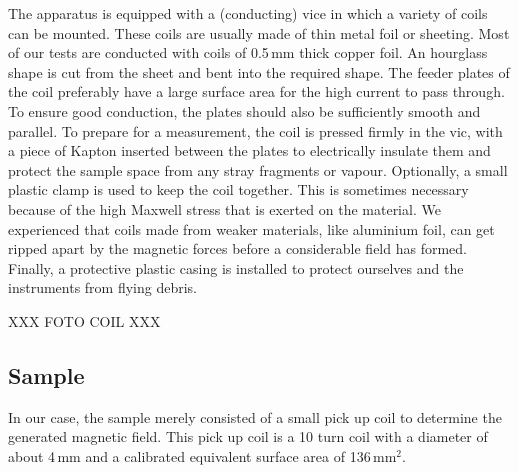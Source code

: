 The apparatus is equipped with a (conducting) vice in which a variety of coils 
can be mounted. These coils are usually made of thin metal foil or sheeting.  
Most of our tests are conducted with coils of 0.5\,mm thick copper foil. An 
hourglass shape is cut from the sheet and bent into the required shape. The 
feeder plates of the coil preferably have a large surface area for the high 
current to pass through. To ensure good conduction, the plates should also be 
sufficiently smooth and parallel. To prepare for a measurement, the coil is 
pressed firmly in the vic, with a piece of Kapton inserted between the plates 
to electrically insulate them and protect the sample space from any stray 
fragments or vapour. Optionally, a small plastic clamp is used to keep the coil 
together. This is sometimes necessary because of the high Maxwell stress that 
is exerted on the material. We experienced that coils made from weaker 
materials, like aluminium foil, can get ripped apart by the magnetic forces 
before a considerable field has formed. Finally, a protective plastic casing is 
installed to protect ourselves and the instruments from flying debris.

XXX FOTO COIL XXX

\subsection{Sample}
In our case, the sample merely consisted of a small pick up coil to 
determine the generated magnetic field. This pick up coil is a 10 turn coil 
with a diameter of about 4\,mm and a calibrated equivalent surface area of 
136\,mm$^2$.

